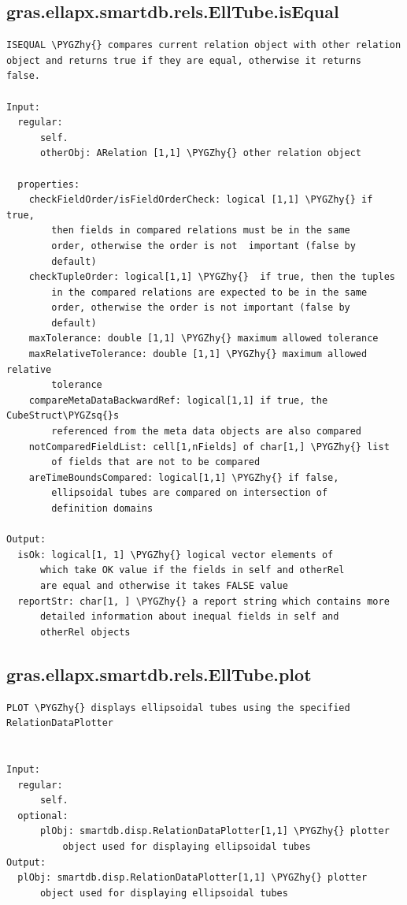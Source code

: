 \documentclass[letterpaper,10pt,english]{sphinxmanual}
\def\PYGZhy{\char`\-}
\def\PYGZsq{\char`\'}
\begin{document}
\subsection{gras.ellapx.smartdb.rels.EllTube.isEqual}
\label{chap_functions:gras-ellapx-smartdb-rels-elltube-isequal}
\begin{Verbatim}[commandchars=\\\{\}]
ISEQUAL \PYGZhy{} compares current relation object with other relation
object and returns true if they are equal, otherwise it returns
false.

Input:
  regular:
      self.
      otherObj: ARelation [1,1] \PYGZhy{} other relation object

  properties:
    checkFieldOrder/isFieldOrderCheck: logical [1,1] \PYGZhy{} if true,
        then fields in compared relations must be in the same
        order, otherwise the order is not  important (false by
        default)
    checkTupleOrder: logical[1,1] \PYGZhy{}  if true, then the tuples
        in the compared relations are expected to be in the same
        order, otherwise the order is not important (false by
        default)
    maxTolerance: double [1,1] \PYGZhy{} maximum allowed tolerance
    maxRelativeTolerance: double [1,1] \PYGZhy{} maximum allowed relative
        tolerance
    compareMetaDataBackwardRef: logical[1,1] if true, the CubeStruct\PYGZsq{}s
        referenced from the meta data objects are also compared
    notComparedFieldList: cell[1,nFields] of char[1,] \PYGZhy{} list
        of fields that are not to be compared
    areTimeBoundsCompared: logical[1,1] \PYGZhy{} if false,
        ellipsoidal tubes are compared on intersection of
        definition domains

Output:
  isOk: logical[1, 1] \PYGZhy{} logical vector elements of
      which take OK value if the fields in self and otherRel
      are equal and otherwise it takes FALSE value
  reportStr: char[1, ] \PYGZhy{} a report string which contains more
      detailed information about inequal fields in self and
      otherRel objects
\end{Verbatim}


\subsection{gras.ellapx.smartdb.rels.EllTube.plot}
\label{chap_functions:gras-ellapx-smartdb-rels-elltube-plot}
\begin{Verbatim}[commandchars=\\\{\}]
PLOT \PYGZhy{} displays ellipsoidal tubes using the specified RelationDataPlotter


Input:
  regular:
      self.
  optional:
      plObj: smartdb.disp.RelationDataPlotter[1,1] \PYGZhy{} plotter
          object used for displaying ellipsoidal tubes
Output:
  plObj: smartdb.disp.RelationDataPlotter[1,1] \PYGZhy{} plotter
      object used for displaying ellipsoidal tubes
\end{Verbatim}
\end{document}
